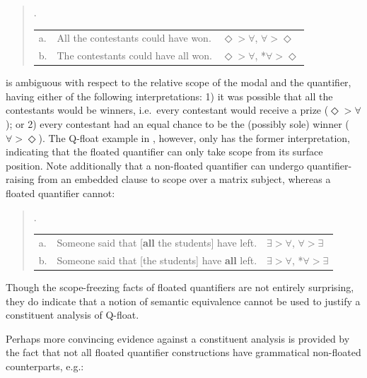 \singlespacing
\begin{quote}
\ex.
\begin{tabular}[t]{lll}
a. & All the contestants could have won. & $\Diamond>\forall$, $\forall>\Diamond$\\
b. & The contestants could have all won. & $\Diamond>\forall$, *$\forall>\Diamond$\\
\end{tabular}

\end{quote}
\onehalfspacing
\Last[a] is ambiguous with respect to the relative scope of the modal and the quantifier, having either of the following interpretations: 1) it was possible that all the contestants would be winners, i.e.\ every contestant would receive a prize ($\Diamond>\forall$); or 2) every contestant had an equal chance to be the (possibly sole) winner ($\forall>\Diamond$). The Q-float example in \Last[b], however, only has the former interpretation, indicating that the floated quantifier can only take scope from its surface position. Note additionally that a non-floated quantifier can undergo quantifier-raising from an embedded clause to scope over a matrix subject, whereas a floated quantifier cannot:

\singlespacing
\begin{quote}
\ex.
\begin{tabular}[t]{lll}
a. & Someone said that [{\bf all} the students] have left. & $\exists>\forall$, $\forall>\exists$\\
b. & Someone said that [the students] have {\bf all} left. & $\exists>\forall$, *$\forall>\exists$\\
\end{tabular}

\end{quote}
\onehalfspacing
Though the scope-freezing facts of floated quantifiers are not entirely surprising, they do indicate that a notion of semantic equivalence cannot be used to justify a constituent analysis of Q-float.

Perhaps more convincing evidence against a constituent analysis is provided by the fact that not all floated quantifier constructions have grammatical non-floated counterparts, e.g.:

